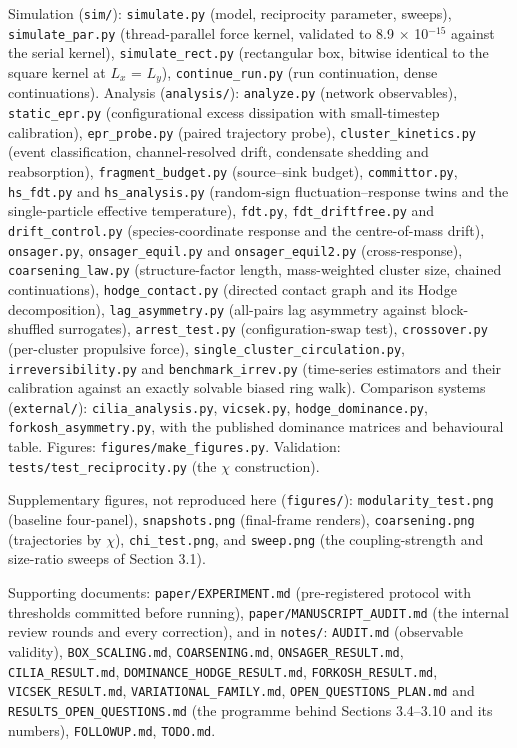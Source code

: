 \documentclass[aps,pre,preprint,superscriptaddress,nofootinbib,longbibliography]{revtex4-2}
\begin{document}
Simulation (\texttt{sim/}): \texttt{simulate.py} (model, reciprocity parameter, sweeps), \texttt{simulate\_par.py} (thread-parallel force kernel, validated to 8.9 $\times$ 10$^{-15}$ against the serial kernel), \texttt{simulate\_rect.py} (rectangular box, bitwise identical to the square kernel at $L_x$ = $L_y$), \texttt{continue\_run.py} (run continuation, dense continuations). Analysis (\texttt{analysis/}): \texttt{analyze.py} (network observables), \texttt{static\_epr.py} (configurational excess dissipation with small-timestep calibration), \texttt{epr\_probe.py} (paired trajectory probe), \texttt{cluster\_kinetics.py} (event classification, channel-resolved drift, condensate shedding and reabsorption), \texttt{fragment\_budget.py} (source--sink budget), \texttt{committor.py}, \texttt{hs\_fdt.py} and \texttt{hs\_analysis.py} (random-sign fluctuation--response twins and the single-particle effective temperature), \texttt{fdt.py}, \texttt{fdt\_driftfree.py} and \texttt{drift\_control.py} (species-coordinate response and the centre-of-mass drift), \texttt{onsager.py}, \texttt{onsager\_equil.py} and \texttt{onsager\_equil2.py} (cross-response), \texttt{coarsening\_law.py} (structure-factor length, mass-weighted cluster size, chained continuations), \texttt{hodge\_contact.py} (directed contact graph and its Hodge decomposition), \texttt{lag\_asymmetry.py} (all-pairs lag asymmetry against block-shuffled surrogates), \texttt{arrest\_test.py} (configuration-swap test), \texttt{crossover.py} (per-cluster propulsive force), \texttt{single\_cluster\_circulation.py}, \texttt{irreversibility.py} and \texttt{benchmark\_irrev.py} (time-series estimators and their calibration against an exactly solvable biased ring walk). Comparison systems (\texttt{external/}): \texttt{cilia\_analysis.py}, \texttt{vicsek.py}, \texttt{hodge\_dominance.py}, \texttt{forkosh\_asymmetry.py}, with the published dominance matrices and behavioural table. Figures: \texttt{figures/make\_figures.py}. Validation: \texttt{tests/test\_reciprocity.py} (the $\chi$ construction).

Supplementary figures, not reproduced here (\texttt{figures/}): \texttt{modularity\_test.png} (baseline four-panel), \texttt{snapshots.png} (final-frame renders), \texttt{coarsening.png} (trajectories by $\chi$), \texttt{chi\_test.png}, and \texttt{sweep.png} (the coupling-strength and size-ratio sweeps of Section 3.1).

Supporting documents: \texttt{paper/EXPERIMENT.md} (pre-registered protocol with thresholds committed before running), \texttt{paper/MANUSCRIPT\_AUDIT.md} (the internal review rounds and every correction), and in \texttt{notes/}: \texttt{AUDIT.md} (observable validity), \texttt{BOX\_SCALING.md}, \texttt{COARSENING.md}, \texttt{ONSAGER\_RESULT.md}, \texttt{CILIA\_RESULT.md}, \texttt{DOMINANCE\_HODGE\_RESULT.md}, \texttt{FORKOSH\_RESULT.md}, \texttt{VICSEK\_RESULT.md}, \texttt{VARIATIONAL\_FAMILY.md}, \texttt{OPEN\_QUESTIONS\_PLAN.md} and \texttt{RESULTS\_OPEN\_QUESTIONS.md} (the programme behind Sections 3.4--3.10 and its numbers), \texttt{FOLLOWUP.md}, \texttt{TODO.md}.
\end{document}
